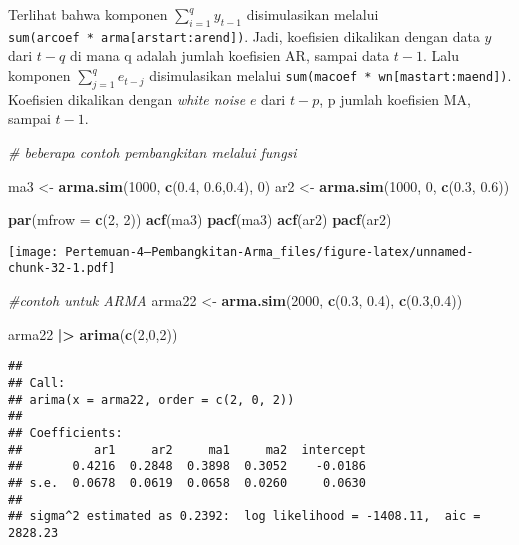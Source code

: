 \documentclass[
]{article}
\newenvironment{Shaded}{\begin{snugshade}}{\end{snugshade}}
\newcommand{\AttributeTok}[1]{\textcolor[rgb]{0.13,0.29,0.53}{#1}}
\newcommand{\CommentTok}[1]{\textcolor[rgb]{0.56,0.35,0.01}{\textit{#1}}}
\newcommand{\DecValTok}[1]{\textcolor[rgb]{0.00,0.00,0.81}{#1}}
\newcommand{\FloatTok}[1]{\textcolor[rgb]{0.00,0.00,0.81}{#1}}
\newcommand{\FunctionTok}[1]{\textcolor[rgb]{0.13,0.29,0.53}{\textbf{#1}}}
\newcommand{\NormalTok}[1]{#1}
\newcommand{\OtherTok}[1]{\textcolor[rgb]{0.56,0.35,0.01}{#1}}
\newcommand{\SpecialCharTok}[1]{\textcolor[rgb]{0.81,0.36,0.00}{\textbf{#1}}}
\begin{document}
Terlihat bahwa komponen \(\sum_{i=1}^q y_{t-1}\) disimulasikan melalui
\texttt{sum(arcoef\ *\ arma{[}arstart:arend{]})}. Jadi, koefisien
dikalikan dengan data \(y\) dari \(t-q\) di mana q adalah jumlah
koefisien AR, sampai data \(t-1\). Lalu komponen
\(\sum_{j=1}^q e_{t-j}\) disimulasikan melalui
\texttt{sum(macoef\ *\ wn{[}mastart:maend{]})}. Koefisien dikalikan
dengan \emph{white noise} \(e\) dari \(t-p\), p jumlah koefisien MA,
sampai \(t-1\).

\begin{Shaded}
\begin{Highlighting}[]
\CommentTok{\# beberapa contoh pembangkitan melalui fungsi}

\NormalTok{ma3 }\OtherTok{\textless{}{-}} \FunctionTok{arma.sim}\NormalTok{(}\DecValTok{1000}\NormalTok{, }\FunctionTok{c}\NormalTok{(}\FloatTok{0.4}\NormalTok{, }\FloatTok{0.6}\NormalTok{,}\FloatTok{0.4}\NormalTok{), }\DecValTok{0}\NormalTok{)}
\NormalTok{ar2 }\OtherTok{\textless{}{-}} \FunctionTok{arma.sim}\NormalTok{(}\DecValTok{1000}\NormalTok{, }\DecValTok{0}\NormalTok{, }\FunctionTok{c}\NormalTok{(}\FloatTok{0.3}\NormalTok{, }\FloatTok{0.6}\NormalTok{))}

\FunctionTok{par}\NormalTok{(}\AttributeTok{mfrow =} \FunctionTok{c}\NormalTok{(}\DecValTok{2}\NormalTok{, }\DecValTok{2}\NormalTok{))}
\FunctionTok{acf}\NormalTok{(ma3)}
\FunctionTok{pacf}\NormalTok{(ma3)}
\FunctionTok{acf}\NormalTok{(ar2)}
\FunctionTok{pacf}\NormalTok{(ar2)}
\end{Highlighting}
\end{Shaded}

\texttt{[image: Pertemuan-4---Pembangkitan-Arma\_files/figure-latex/unnamed-chunk-32-1.pdf]}

\begin{Shaded}
\begin{Highlighting}[]
\CommentTok{\#contoh untuk ARMA}
\NormalTok{arma22 }\OtherTok{\textless{}{-}} \FunctionTok{arma.sim}\NormalTok{(}\DecValTok{2000}\NormalTok{, }\FunctionTok{c}\NormalTok{(}\FloatTok{0.3}\NormalTok{, }\FloatTok{0.4}\NormalTok{), }\FunctionTok{c}\NormalTok{(}\FloatTok{0.3}\NormalTok{,}\FloatTok{0.4}\NormalTok{))}

\NormalTok{arma22 }\SpecialCharTok{|\textgreater{}} \FunctionTok{arima}\NormalTok{(}\FunctionTok{c}\NormalTok{(}\DecValTok{2}\NormalTok{,}\DecValTok{0}\NormalTok{,}\DecValTok{2}\NormalTok{))}
\end{Highlighting}
\end{Shaded}

\begin{verbatim}
## 
## Call:
## arima(x = arma22, order = c(2, 0, 2))
## 
## Coefficients:
##          ar1     ar2     ma1     ma2  intercept
##       0.4216  0.2848  0.3898  0.3052    -0.0186
## s.e.  0.0678  0.0619  0.0658  0.0260     0.0630
## 
## sigma^2 estimated as 0.2392:  log likelihood = -1408.11,  aic = 2828.23
\end{verbatim}
\end{document}

